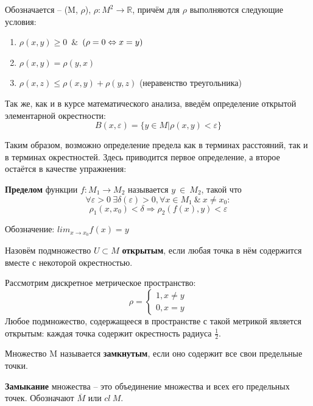 \documentclass[12pt]{article}
\begin{document}
	Обозначается -- (M, $\rho$), $\rho : M^2 \rightarrow 
	\mathbb{R}$, причём для $\rho$ выполняются следующие условия:
	\begin{enumerate}
		\item $\rho(x,y) \geq 0$~$\&$~$(\rho = 0 \Leftrightarrow x=y)$
		\item $\rho(x,y) = \rho(y,x)$
		\item $\rho(x,z) \leq \rho(x,y) + \rho(y,z)$ (неравенство треугольника)
	\end{enumerate}
	
	Так же, как и в курсе математического анализа, введём определение открытой элементарной окрестности:
	$$B(x, \varepsilon) = \{y \in M | \rho(x,y) < \varepsilon\}$$
	
	Таким образом, возможно определение предела как в терминах расстояний, так и в терминах окрестностей. Здесь приводится первое 
	определение, а второе остаётся в качестве упражнения:
	
	\begin{defi}
		\textbf{Пределом} функции $f : M_1 \rightarrow M_2$ называется $y~\in~M_2$, такой что 
		$$\forall \varepsilon > 0 ~\exists 
		\delta(\varepsilon) > 0, \forall x \in M_1 ~\&~ x  \neq x_0 : $$
		$$\rho_1(x, x_0) < \delta \Rightarrow \rho_2(f(x), y) < \varepsilon$$
	\end{defi}
	
	Обозначение: $lim_{x \rightarrow x_0} f(x) = y$
	
	\begin{defi}
		Назовём подмножество $U \subset M$ \textbf{открытым}, если любая точка в нём содержится вместе с некоторой окрестностью.
	\end{defi}
	
	\example Рассмотрим дискретное метрическое пространство:
	$$
		\rho = 
		\begin{cases}
			1, x \neq y \\
			0, x = y
		\end{cases}
	$$
	Любое подмножество, содержащееся в пространстве с такой метрикой является открытым: каждая точка содержит окрестность радиуса 
	$\frac{1}{2}$.
	
	\begin{defi}
		Множество M называется \textbf{замкнутым}, если оно содержит все свои предельные точки.
	\end{defi}
	
	\begin{defi}
		\textbf{Замыкание} множества -- это объединение множества и всех его предельных точек. Обозначают $\overline{M}$ или $cl ~ M$.
	\end{defi}
	
\end{document}
